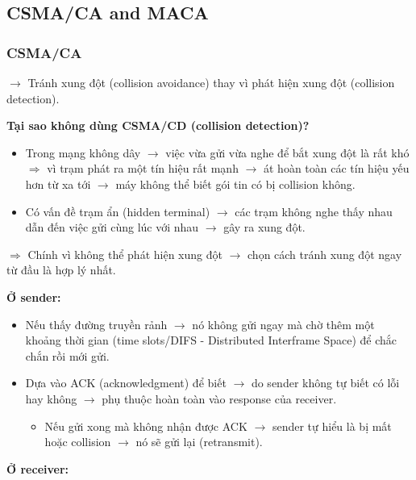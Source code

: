 \subsection{CSMA/CA and MACA}

\subsubsection{CSMA/CA}

\noindent
$\rightarrow$ Tránh xung đột (collision avoidance) thay vì phát hiện xung đột (collision detection).
\medskip

\noindent
\textbf{Tại sao không dùng CSMA/CD (collision detection)?}

\begin{itemize}
    \item Trong mạng không dây $\rightarrow$ việc vừa gửi vừa nghe để bắt xung đột là rất khó $\Rightarrow$ vì trạm phát ra một tín hiệu rất mạnh $\rightarrow$ át hoàn toàn các tín hiệu yếu hơn từ xa tới $\rightarrow$ máy không thể biết gói tin có bị collision không.
    \item Có vấn đề trạm ẩn (hidden terminal) $\rightarrow$ các trạm không nghe thấy nhau dẫn đến việc gửi cùng lúc với nhau $\rightarrow$ gây ra xung đột.
\end{itemize}
\medskip

\noindent
$\Rightarrow$ Chính vì không thể phát hiện xung đột $\rightarrow$ chọn cách tránh xung đột ngay từ đầu là hợp lý nhất.
\medskip

\noindent
\textbf{Ở sender:}

\begin{itemize}
    \item Nếu thấy đường truyền rảnh $\rightarrow$ nó không gửi ngay mà chờ thêm một khoảng thời gian (time slots/DIFS - Distributed Interframe Space) để chắc chắn rồi mới gửi.
    \item Dựa vào ACK (acknowledgment) để biết $\rightarrow$ do sender không tự biết có lỗi hay không $\rightarrow$ phụ thuộc hoàn toàn vào response của receiver. \begin{itemize}
        \item[$\Rightarrow$] Nếu gửi xong mà không nhận được ACK $\rightarrow$ sender tự hiểu là bị mất hoặc collision $\rightarrow$ nó sẽ gửi lại (retransmit).
    \end{itemize}
\end{itemize}
\medskip

\noindent
\textbf{Ở receiver:}

